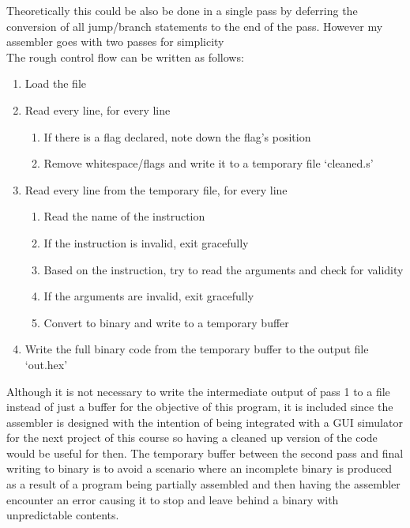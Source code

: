 \documentclass[12pt]{article}
\begin{document}
	Theoretically this could be also be done in a single pass by deferring the conversion of all jump/branch statements to the end of the pass. However my assembler goes with two passes for simplicity\\
	The rough control flow can be written as follows:\\

	\begin{enumerate}
		\item{Load the file}
		
		\item{Read every line, for every line \begin{enumerate} 
			\item{If there is a flag declared, note down the flag's position}
			\item{Remove whitespace/flags and write it to a temporary file `cleaned.s'}
			\end{enumerate}}

		\item{Read every line from the temporary file, for every line\begin{enumerate} 
			\item{Read the name of the instruction}
			\item{If the instruction is invalid, exit gracefully}
			\item{Based on the instruction, try to read the arguments and check for validity}
			\item{If the arguments are invalid, exit gracefully}
			\item{Convert to binary and write to a temporary buffer}
			\end{enumerate}}

		\item{Write the full binary code from the temporary buffer to the output file `out.hex'\\}
	\end{enumerate}

	Although it is not necessary to write the intermediate output of pass 1 to a file instead of just a buffer for the objective of this program, it is included since the assembler is designed with the intention of being integrated with a GUI simulator for the next project of this course so having a cleaned up version of the code would be useful for then.
	The temporary buffer between the second pass and final writing to binary is to avoid a scenario where an incomplete binary is produced as a result of a program being partially assembled and then having the assembler encounter an error causing it to stop and leave behind a binary with unpredictable contents.
\end{document}
